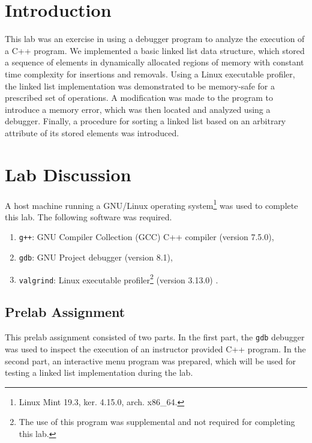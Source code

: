 \documentclass[11pt, letterpaper]{article} %
\begin{document}
\makelabtitle

\section*{Introduction}

This lab was an exercise in using a debugger program to analyze the execution of a C++ program. We implemented a basic linked list data structure, which stored a sequence of elements in dynamically allocated regions of memory with constant time complexity for insertions and removals. Using a Linux executable profiler, the linked list implementation was demonstrated to be memory-safe for a prescribed set of operations. A modification was made to the program to introduce a memory error, which was then located and analyzed using a debugger. Finally, a procedure for sorting a linked list based on an arbitrary attribute of its stored elements was introduced.


\section*{Lab Discussion}

A host machine running a GNU/Linux operating system\footnote{Linux Mint 19.3, ker. 4.15.0, arch. x86\_64.}  was used to complete this lab. The following software was required.
\begin{enumerate}
    \item \texttt{g++}: GNU Compiler Collection (GCC) C++ compiler (version 7.5.0),
    \item \texttt{gdb}: GNU Project debugger (version 8.1),
    \item \texttt{valgrind}: Linux executable profiler\footnote{The use of this program was supplemental and not required for completing this lab.} (version 3.13.0) \cite{valgrind}.
\end{enumerate}
 
\subsection*{Prelab Assignment}

This prelab assignment consisted of two parts. In the first part, the \texttt{gdb} debugger was used to inspect the execution of an instructor provided C++ program. In the second part, an interactive menu program was prepared, which will be used for testing a linked list implementation during the lab.
\end{document}
